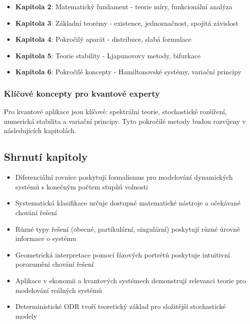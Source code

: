 \begin{itemize}
\item \textbf{Kapitola 2}: Matematický fundament - teorie míry, funkcionální analýza
\item \textbf{Kapitola 3}: Základní teorémy - existence, jednoznačnost, spojitá závislost
\item \textbf{Kapitola 4}: Pokročilý aparát - distribuce, slabá formulace
\item \textbf{Kapitola 5}: Teorie stability - Ljapunovovy metody, bifurkace
\item \textbf{Kapitola 6}: Pokročilé koncepty - Hamiltonovské systémy, variační principy
\end{itemize}

\subsubsection{Klíčové koncepty pro kvantové experty}

\begin{keyinsight}
Pro kvantové aplikace jsou klíčové: spektrální teorie, stochastické rozšíření, numerická stabilita a variační principy. Tyto pokročilé metody budou rozvíjeny v následujících kapitolách.
\end{keyinsight}

\spc

\subsection*{Shrnutí kapitoly}

\begin{itemize}
\item Diferenciální rovnice poskytují formalismus pro modelování dynamických systémů s konečným počtem stupňů volnosti

\item Systematická klasifikace určuje dostupné matematické nástroje a očekávané chování řešení

\item Různé typy řešení (obecné, partikulární, singulární) poskytují různé úrovně informace o systému

\item Geometrická interpretace pomocí fázových portrétů poskytuje intuitivní porozumění chování řešení

\item Aplikace v ekonomii a kvantových systémech demonstrují relevanci teorie pro modelování reálných systémů

\item Deterministické ODR tvoří teoretický základ pro složitější stochastické modely
\end{itemize}

